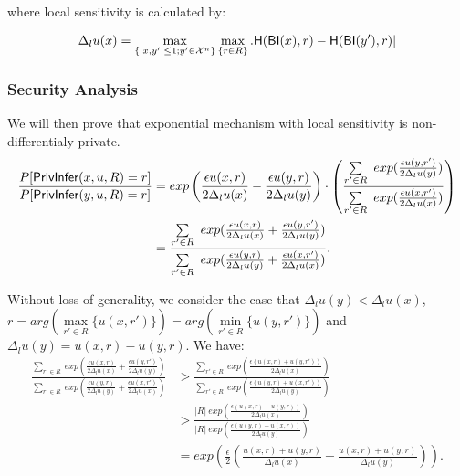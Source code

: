where local sensitivity is calculated by:

\begin{equation*}
\Delta_{l}u(x) = 
\max_{\{|x,y'| \leq 1;y'\in \mathcal{X}^n\}}\max_{\{r\in R\}}.
\mathsf{H}(\mathsf{BI}(x), r) - \mathsf{H}(\mathsf{BI}(y'), r)|
\end{equation*}

\subsubsection{Security Analysis}
We will then prove that exponential mechanism with local sensitivity is non-differentialy private.
\begin{equation*}
\begin{split}
\frac{P[\mathsf{PrivInfer}(x,u,R) = r]}{P[\mathsf{PrivInfer}(y,u,R) = r]} 
& = exp\left(
\frac{\epsilon u(x,r)}{2 \Delta_{l}u(x)} - 
\frac{\epsilon u(y,r)}{2 \Delta_{l}u(y)}
\right)  \cdot
\left(\frac
{\sum\limits_{r' \in R}\ exp(\frac{\epsilon u(y,r')}{2 \Delta_{l}u(y)})}
{\sum\limits_{r' \in R}\ exp(\frac{\epsilon u(x,r')}{2 \Delta_{l}u(x)})}
\right) \\
& = \frac
{\sum\limits_{r' \in R}\ exp(\frac{\epsilon u(x,r)}{2 \Delta_{l}u(x)} 
+ \frac{\epsilon u(y,r')}{2 \Delta_{l}u(y)})}
{\sum\limits_{r' \in R}\ exp(\frac{\epsilon u(y,r)}{2 \Delta_{l}u(y)} 
+ \frac{\epsilon u(x,r')}{2 \Delta_{l}u(x)})}.
\end{split}
\end{equation*}

Without loss of generality, we consider the case that $\Delta_{l}u(y) < \Delta_{l}u(x)$, $r = arg(\max\limits_{r' \in R}\{u(x,r')\}) = arg(\min\limits_{r' \in R}\{u(y,r')\})$ and $\Delta_{l}u(y) = u(x,r) - u(y,r)$. We have:
\begin{equation*}
\begin{split}
\frac
{\sum\limits_{r' \in R}\ exp(\frac{\epsilon u(x,r)}{2 \Delta_{l}u(x)} 
+ \frac{\epsilon u(y,r')}{2 \Delta_{l}u(y)})}
{\sum\limits_{r' \in R}\ exp(\frac{\epsilon u(y,r)}{2 \Delta_{l}u(y)} 
+ \frac{\epsilon u(x,r')}{2 \Delta_{l}u(x)})}
& > \frac
{\sum\limits_{r' \in R}\ exp(\frac{\epsilon (u(x,r) + u(y,r'))}{2 \Delta_{l}u(x)})}
{\sum\limits_{r' \in R}\ exp(\frac{\epsilon (u(y,r) + u(x,r'))}{2 \Delta_{l}u(y)})}\\
& > \frac
{|R|\ exp(\frac{\epsilon (u(x,r) + u(y,r))}{2 \Delta_{l}u(x)})}
{|R|\ exp(\frac{\epsilon (u(y,r) + u(x,r))}{2 \Delta_{l}u(y)})}\\
& = exp(\frac{\epsilon}{2} (\frac{u(x,r) + u(y,r)}{\Delta_{l}u(x)} - \frac{u(x,r) + u(y,r)}{\Delta_{l}u(y)})).
\end{split}
\end{equation*}


